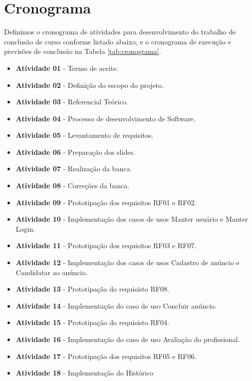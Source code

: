 \chapter{Cronograma}\label{cap:desenvolvimento}
Definimos o cronograma de atividades para desenvolvimento do trabalho de conclusão de curso conforme listado abaixo, e o cronograma de execução e previsões de conclusão na Tabela \ref{tab:cronograma}.

\begin{itemize}
    \item \textbf{Atividade 01} - Termo de aceite.
    \item \textbf{Atividade 02} - Definição do escopo do projeto.
    \item \textbf{Atividade 03} - Referencial Teórico.
    \item \textbf{Atividade 04} - Processo de desenvolvimento de Software.
    \item \textbf{Atividade 05} - Levantamento de requisitos.
    \item \textbf{Atividade 06} - Preparação dos slides.
    \item \textbf{Atividade 07} - Realização da banca.
    \item \textbf{Atividade 08} - Correções da banca.
    \item \textbf{Atividade 09} - Prototipação dos requisitos RF01 e RF02.
    \item \textbf{Atividade 10} - Implementação dos casos de usos Manter usuário e Manter Login.
    \item \textbf{Atividade 11} - Prototipação dos requisitos RF03 e RF07.
    \item \textbf{Atividade 12} - Implementação dos casos de usos Cadastro de anúncio e Candidatar ao anúncio.
    \item \textbf{Atividade 13} - Prototipação do requisisto RF08.
    \item \textbf{Atividade 14} - Implementação do caso de uso Concluir anúncio.
    \item \textbf{Atividade 15} - Prototipação do requisisto RF04.
    \item \textbf{Atividade 16} - Implementação do caso de uso Avaliação do profissional.
    \item \textbf{Atividade 17} - Prototipação dos requisitos RF05 e RF06.
    \item \textbf{Atividade 18} - Implementação do Histórico
\end{itemize}

